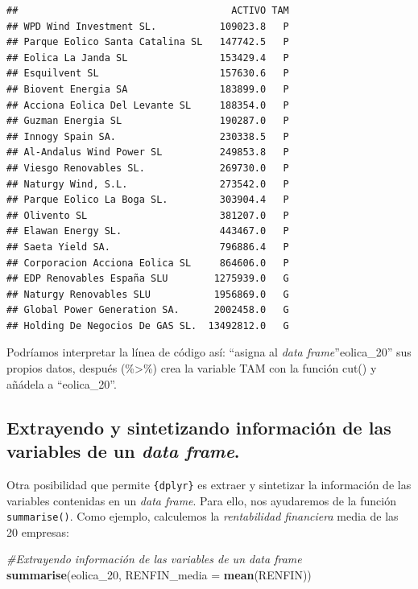 \documentclass[
]{book}
\newenvironment{Shaded}{\begin{snugshade}}{\end{snugshade}}
\newcommand{\AttributeTok}[1]{\textcolor[rgb]{0.13,0.29,0.53}{#1}}
\newcommand{\CommentTok}[1]{\textcolor[rgb]{0.56,0.35,0.01}{\textit{#1}}}
\newcommand{\FunctionTok}[1]{\textcolor[rgb]{0.13,0.29,0.53}{\textbf{#1}}}
\newcommand{\NormalTok}[1]{#1}
\begin{document}
\begin{verbatim}
##                                     ACTIVO TAM
## WPD Wind Investment SL.           109023.8   P
## Parque Eolico Santa Catalina SL   147742.5   P
## Eolica La Janda SL                153429.4   P
## Esquilvent SL                     157630.6   P
## Biovent Energia SA                183899.0   P
## Acciona Eolica Del Levante SL     188354.0   P
## Guzman Energia SL                 190287.0   P
## Innogy Spain SA.                  230338.5   P
## Al-Andalus Wind Power SL          249853.8   P
## Viesgo Renovables SL.             269730.0   P
## Naturgy Wind, S.L.                273542.0   P
## Parque Eolico La Boga SL.         303904.4   P
## Olivento SL                       381207.0   P
## Elawan Energy SL.                 443467.0   P
## Saeta Yield SA.                   796886.4   P
## Corporacion Acciona Eolica SL     864606.0   P
## EDP Renovables España SLU        1275939.0   G
## Naturgy Renovables SLU           1956869.0   G
## Global Power Generation SA.      2002458.0   G
## Holding De Negocios De GAS SL.  13492812.0   G
\end{verbatim}

Podríamos interpretar la línea de código así: ``asigna al \emph{data frame}''eolica\_20'' sus propios datos, después (\%\textgreater\%) crea la variable TAM con la función cut() y añádela a ``eolica\_20''.

\subsection{\texorpdfstring{Extrayendo y sintetizando información de las variables de un \emph{data frame}.}{Extrayendo y sintetizando información de las variables de un data frame.}}\label{extrayendo-y-sintetizando-informaciuxf3n-de-las-variables-de-un-data-frame.}

Otra posibilidad que permite \texttt{\{dplyr\}} es extraer y sintetizar la información de las variables contenidas en un \emph{data frame}. Para ello, nos ayudaremos de la función \texttt{summarise()}. Como ejemplo, calculemos la \emph{rentabilidad financiera} media de las 20 empresas:

\begin{Shaded}
\begin{Highlighting}[]
\CommentTok{\#Extrayendo información de las variables de un data frame}
\FunctionTok{summarise}\NormalTok{(eolica\_20, }\AttributeTok{RENFIN\_media =} \FunctionTok{mean}\NormalTok{(RENFIN)) }
\end{Highlighting}
\end{Shaded}
\end{document}
